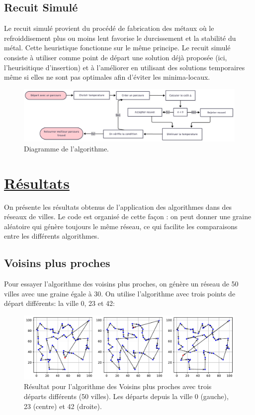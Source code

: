 \documentclass[a4paper,11pt,fleqn]{article}
\begin{document}
\subsection*{Recuit Simulé}
Le recuit simulé \cite{article:recuit}provient du procédé de fabrication des métaux où le refroiddisement plus ou moins lent favorise le durcissement et la stabilité du métal. Cette heuristique fonctionne sur le même principe.
Le recuit simulé consiste à utiliser comme point de départ une solution déjà proposée (ici, l'heurisitique d'insertion) et à l’améliorer en utilisant des solutions temporaires même si elles ne sont pas optimales afin d'éviter les minima-locaux. 

\begin{figure}[H]
    \centering
    \includegraphics[width=\textwidth]{images/charte-recuit.png}
    \caption{Diagramme de l'algorithme.}
    \label{fig:charte-recuit}
\end{figure}

\section*{\underline{Résultats}}
On présente les résultats obtenus de l'application des algorithmes dans des réseaux de villes. Le code est organisé de cette façon : on peut donner une graine aléatoire qui génère toujours le même réseau, ce qui facilite les comparaisons entre les différents algorithmes.

\subsection*{Voisins plus proches}
Pour essayer l'algorithme des voisins plus proches, on génère un réseau de 50 villes avec une graine égale à 30. On utilise l'algorithme avec trois points de départ différents: la ville 0, 23 et 42:
\begin{figure}[H]
    \centering
    \includegraphics[width=\textwidth]{images/NN_50_villes_3departs.pdf}
    \caption{Résultat pour l'algorithme des Voisins plus proches avec trois départs différents (50 villes). Les départs depuis la ville 0 (gauche), 23 (centre) et 42 (droite).}
    \label{fig:nn-50}
\end{figure}
\end{document}

